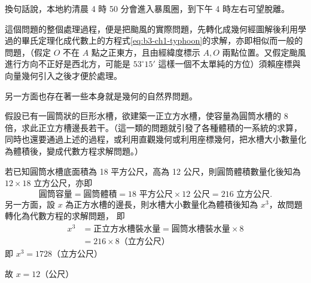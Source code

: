 換句話說，本地約清晨 4 時 50 分會進入暴風圈，到下午 4 時左右可望脫離。

這個問題的整個處理過程，便是把颱風的實際問題，先轉化成幾何經圖解後利用學過的畢氏定理化成代數上的方程式\eqref{eq:b3-ch1-typhoon}的求解，亦即相似而一般的問題，（假定 $O$ 不在 $A$ 點之正東方，且由經緯度標示 $A, O$ 兩點位置。又假定颱風進行方向不正好是西北方，可能是 $53^\circ 15'$ 這樣一個不太單純的方位）須賴座標與向量幾何引入之後才便於處理。\hfill \raisebox{-0.5ex}{\#}

\label{note:b3-ch1-p7-flowchart-sqrt2}%
\begin{center}
\end{center}

另一方面也存在著一些本身就是幾何的自然界問題。

\begin{example}
假設已有一圓筒狀的巨形水槽，欲建築一正立方水槽，使容量為圓筒水槽的 8 倍，求此正立方槽邊長若干。（這一類的問題就引發了各種體積的一系統的求算，同時也還要通過上述的過程，或利用直觀幾何或利用座標幾何，把水槽大小數量化為體積後，變成代數方程求解問題。）

若已知圓筒水槽底面積為 18 平方公尺，高為 12 公尺，則圓筒體積數量化後知為 $12 \times 18$ 立方公尺，亦即
\[ \text{圓筒容量} = \text{圓筒體積} = 18\text{ 平方公尺} \times 12\text{ 公尺} = 216\text{ 立方公尺}. \]
另一方面，設 $x$ 為正方水槽的邊長，則水槽大小數量化為體積後知為 $x^3$，故問題轉化為代數方程的求解問題，
即
\begin{align*}
x^3 &= \text{正立方水槽裝水量} = \text{圓筒水槽裝水量} \times 8 \\
    &= 216 \times 8 \text{（立方公尺）}
\end{align*}
即 $x^3 = 1728$（立方公尺）

故 $x = 12$（公尺）
\end{example}

